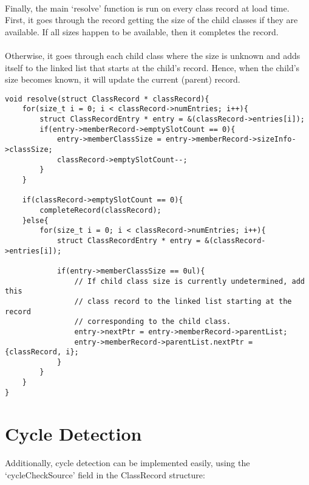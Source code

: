 \documentclass{article}
\begin{document}
\paragraph{}
Finally, the main `resolve' function is run on every class record at load time. First, it goes through the record getting the size of the child classes if they are available. If all sizes happen to be available, then it completes the record.

\paragraph{}
Otherwise, it goes through each child class where the size is unknown and adds itself to the linked list that starts at the child's record. Hence, when the child's size becomes known, it will update the current (parent) record.

\begin{lstlisting}
void resolve(struct ClassRecord * classRecord){
	for(size_t i = 0; i < classRecord->numEntries; i++){
		struct ClassRecordEntry * entry = &(classRecord->entries[i]);
		if(entry->memberRecord->emptySlotCount == 0){
			entry->memberClassSize = entry->memberRecord->sizeInfo->classSize;
			classRecord->emptySlotCount--;
		}
	}
	
	if(classRecord->emptySlotCount == 0){
		completeRecord(classRecord);
	}else{
		for(size_t i = 0; i < classRecord->numEntries; i++){
			struct ClassRecordEntry * entry = &(classRecord->entries[i]);
			
			if(entry->memberClassSize == 0ul){
				// If child class size is currently undetermined, add this
				// class record to the linked list starting at the record
				// corresponding to the child class.
				entry->nextPtr = entry->memberRecord->parentList;
				entry->memberRecord->parentList.nextPtr = {classRecord, i};
			}
		}
	}
}
\end{lstlisting}

\section{Cycle Detection}

\paragraph{}
Additionally, cycle detection can be implemented easily, using the `cycleCheckSource' field in the ClassRecord structure:
\end{document}

